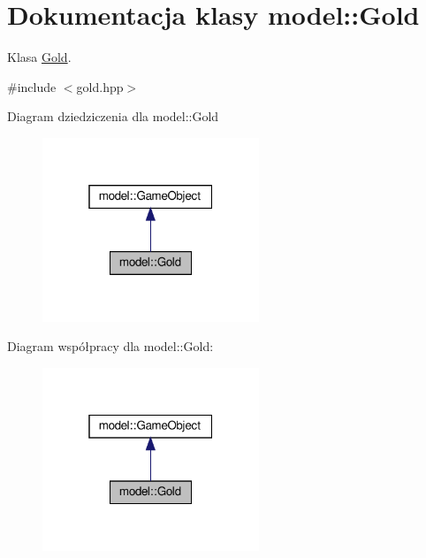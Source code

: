 \hypertarget{classmodel_1_1Gold}{}\section{Dokumentacja klasy model\+:\+:Gold}
\label{classmodel_1_1Gold}


Klasa \hyperlink{classmodel_1_1Gold}{Gold}.  




{\ttfamily \#include $<$gold.\+hpp$>$}



Diagram dziedziczenia dla model\+:\+:Gold\nopagebreak
\begin{figure}[H]
\begin{center}
\leavevmode
\includegraphics[width=184pt]{classmodel_1_1Gold__inherit__graph}
\end{center}
\end{figure}


Diagram współpracy dla model\+:\+:Gold\+:\nopagebreak
\begin{figure}[H]
\begin{center}
\leavevmode
\includegraphics[width=184pt]{classmodel_1_1Gold__coll__graph}
\end{center}
\end{figure}
